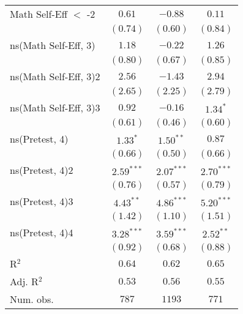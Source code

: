 \begin{center}
\begin{longtable}{l c c c}
Math Self-Eff $<$ -2                      & $0.61$       & $-0.88$      & $0.11$       \\
                                                   & $(0.74)$     & $(0.60)$     & $(0.84)$     \\
ns(Math Self-Eff, 3)                      & $1.18$       & $-0.22$      & $1.26$       \\
                                                   & $(0.80)$     & $(0.67)$     & $(0.85)$     \\
ns(Math Self-Eff, 3)2                     & $2.56$       & $-1.43$      & $2.94$       \\
                                                   & $(2.65)$     & $(2.25)$     & $(2.79)$     \\
ns(Math Self-Eff, 3)3                     & $0.92$       & $-0.16$      & $1.34^{*}$   \\
                                                   & $(0.61)$     & $(0.46)$     & $(0.60)$     \\
ns(Pretest, 4)                      & $1.33^{*}$   & $1.50^{**}$  & $0.87$       \\
                                                   & $(0.66)$     & $(0.50)$     & $(0.66)$     \\
ns(Pretest, 4)2                     & $2.59^{***}$ & $2.07^{***}$ & $2.70^{***}$ \\
                                                   & $(0.76)$     & $(0.57)$     & $(0.79)$     \\
ns(Pretest, 4)3                     & $4.43^{**}$  & $4.86^{***}$ & $5.20^{***}$ \\
                                                   & $(1.42)$     & $(1.10)$     & $(1.51)$     \\
ns(Pretest, 4)4                     & $3.28^{***}$ & $3.59^{***}$ & $2.52^{**}$  \\
                                                   & $(0.92)$     & $(0.68)$     & $(0.88)$     \\
\hline
R$^2$                                              & $0.64$       & $0.62$       & $0.65$       \\
Adj. R$^2$                                         & $0.53$       & $0.56$       & $0.55$       \\
Num. obs.                                          & $787$        & $1193$       & $771$        \\
\end{longtable}
\end{center}
